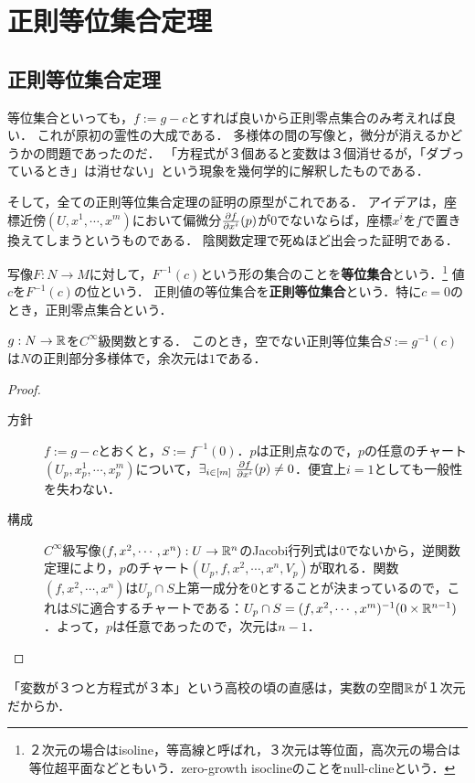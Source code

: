 \documentclass[uplatex,dvipdfmx]{jsreport}
\begin{document}
\section{正則等位集合定理}

\subsection{正則等位集合定理}

\begin{tcolorbox}[colframe=ForestGreen, colback=ForestGreen!10!white,breakable,colbacktitle=ForestGreen!40!white,coltitle=black,fonttitle=\bfseries\sffamily,
title=zero locus / vanishing locus]
    等位集合といっても，$f:=g-c$とすれば良いから正則零点集合のみ考えれば良い．
    これが原初の霊性の大成である．
    多様体の間の写像と，微分が消えるかどうかの問題であったのだ．
    「方程式が３個あると変数は３個消せるが，「ダブっているとき」は消せない」という現象を幾何学的に解釈したものである．

    そして，全ての正則等位集合定理の証明の原型がこれである．
    アイデアは，座標近傍$(U,x^1,\cdots,x^m)$において偏微分$\frac{\partial f}{\partial x^i}(p)$が$0$でないならば，座標$x^i$を$f$で置き換えてしまうというものである．
    陰関数定理で死ぬほど出会った証明である．
\end{tcolorbox}

\begin{definition}
    写像$F:N\to M$に対して，$F^{-1}(c)$という形の集合のことを\textbf{等位集合}という．\footnote{２次元の場合はisoline，等高線と呼ばれ，３次元は等位面，高次元の場合は等位超平面などともいう．zero-growth isoclineのことをnull-clineという．}
    値$c$を$F^{-1}(c)$の位という．
    正則値の等位集合を\textbf{正則等位集合}という．特に$c=0$のとき，正則零点集合という．
\end{definition}

\begin{theorem}
    $g:N\to\mathbb{R}$を$C^\infty$級関数とする．
    このとき，空でない正則等位集合$S:=g^{-1}(c)$は$N$の正則部分多様体で，余次元は$1$である．
\end{theorem}
\begin{proof}\mbox{}
    \begin{description}
        \item[方針] $f:=g-c$とおくと，$S:=f^{-1}(0)$．$p$は正則点なので，$p$の任意のチャート$(U_p,x^1_p,\cdots,x^m_p)$について，$\exists_{i\in[m]}\;\frac{\partial f}{\partial x^i}(p)\ne 0$．便宜上$i=1$としても一般性を失わない．
        \item[構成] $C^\infty$級写像$(f,x^2,\cdots,x^n):U\to\mathbb{R}^n$のJacobi行列式は$0$でないから，逆関数定理により，$p$のチャート$(U_p,f,x^2,\cdots,x^n,V_p)$が取れる．関数$(f,x^2,\cdots,x^n)$は$U_p\cap S$上第一成分を$0$とすることが決まっているので，これは$S$に適合するチャートである：$U_p\cap S=(f,x^2,\cdots,x^m)^{-1}(0\times\mathbb{R}^{n-1})$．よって，$p$は任意であったので，次元は$n-1$．
    \end{description}
\end{proof}
\begin{remarks}
    「変数が３つと方程式が３本」という高校の頃の直感は，実数の空間$\mathbb{R}$が１次元だからか．
\end{remarks}
\end{document}
